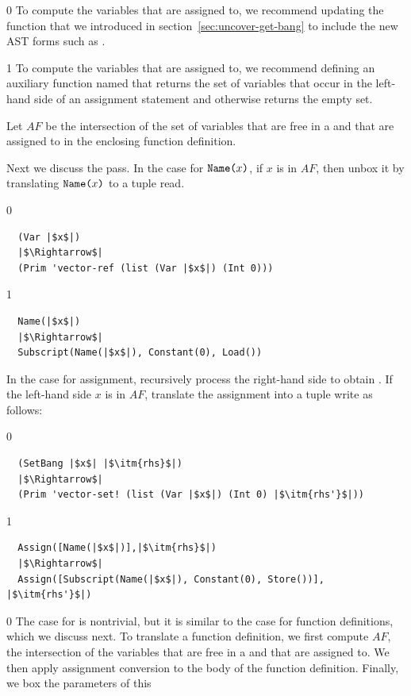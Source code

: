 \documentclass[7x10]{TimesAPriori_MIT}%
\def\racketEd{0}
\def\pythonEd{1}
\def\edition{1}
\newcommand{\pythonColor}[0]{}
\numberwithin{theorem}{chapter}
\numberwithin{definition}{chapter}
\numberwithin{equation}{chapter}
\begin{document}
{\if\edition\racketEd
%
To compute the variables that are assigned to, we recommend updating
the  function that we introduced in
section~\ref{sec:uncover-get-bang} to include the new AST forms such
as .
%
\fi}
  
{\if\edition\pythonEd\pythonColor
%
To compute the variables that are assigned to, we recommend defining
an auxiliary function named  that returns
the set of variables that occur in the left-hand side of an assignment
statement and otherwise returns the empty set.
%
\fi}

Let $\mathit{AF}$ be the intersection of the set of variables that are
free in a  and that are assigned to in the enclosing
function definition.

Next we discuss the  pass.  In the case for
$\texttt{Name}\texttt{(} x\texttt{)}$, if $x$ is in $\mathit{AF}$, then unbox it by translating
$\texttt{Name}\texttt{(} x\texttt{)}$ to a tuple read.
%
{\if\edition\racketEd
\begin{lstlisting}
  (Var |$x$|)
  |$\Rightarrow$|
  (Prim 'vector-ref (list (Var |$x$|) (Int 0)))
\end{lstlisting}
\fi}
%
{\if\edition\pythonEd\pythonColor
\begin{lstlisting}
  Name(|$x$|)
  |$\Rightarrow$|
  Subscript(Name(|$x$|), Constant(0), Load())
\end{lstlisting}
\fi}
%
\noindent In the case for assignment, recursively process the
right-hand side  to obtain .  If the left-hand side
$x$ is in $\mathit{AF}$, translate the assignment into a tuple write
as follows:
%
{\if\edition\racketEd
\begin{lstlisting}
  (SetBang |$x$| |$\itm{rhs}$|)
  |$\Rightarrow$|
  (Prim 'vector-set! (list (Var |$x$|) (Int 0) |$\itm{rhs'}$|))
\end{lstlisting}
\fi}
{\if\edition\pythonEd\pythonColor
\begin{lstlisting}
  Assign([Name(|$x$|)],|$\itm{rhs}$|)
  |$\Rightarrow$|
  Assign([Subscript(Name(|$x$|), Constant(0), Store())], |$\itm{rhs'}$|)
\end{lstlisting}
\fi}
%
{\if\edition\racketEd
The case for  is nontrivial, but it is similar to the
case for function definitions, which we discuss next.
\fi}
%
To translate a function definition, we first compute $\mathit{AF}$,
the intersection of the variables that are free in a  and
that are assigned to. We then apply assignment conversion to the body
of the function definition. Finally, we box the parameters of this
\end{document}
